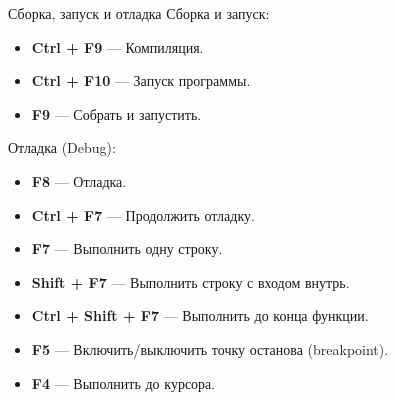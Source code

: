 \begin{frame}[t]{Сборка, запуск и отладка}
  Сборка и запуск:
  \begin{itemize}
    \item \textbf{Ctrl + F9} --- Компиляция. 
    \item \textbf{Ctrl + F10} --- Запуск программы. 
    \item \textbf{F9} --- Собрать и запустить. 
  \end{itemize}

  Отладка (Debug):
  \begin{itemize}
    \item \textbf{F8} --- Отладка. 
    \item \textbf{Ctrl + F7} --- Продолжить отладку. 
    \item \textbf{F7} --- Выполнить одну строку. 
    \item \textbf{Shift + F7} --- Выполнить строку с входом внутрь. 
    \item \textbf{Ctrl + Shift + F7} --- Выполнить до конца функции. 
    \item \textbf{F5} --- Включить/выключить точку останова (breakpoint). 
    \item \textbf{F4} --- Выполнить до курсора. 
  \end{itemize}
\end{frame}